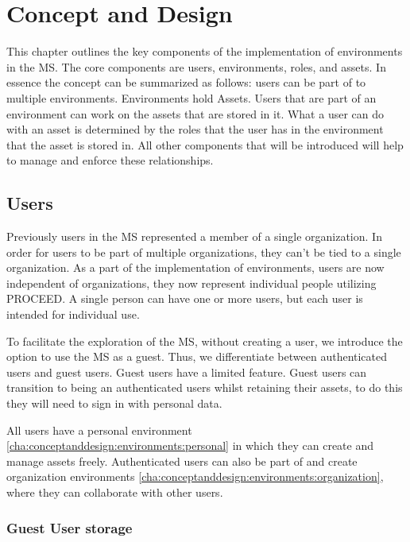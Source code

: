 \chapter{Concept and Design}
\label{cha:conceptanddesign}

This chapter outlines the key components of the implementation of environments in the MS.
The core components are users, environments, roles, and assets.
In essence the concept can be summarized as follows: users can be part of to multiple environments.
Environments hold Assets.
Users that are part of an environment can work on the assets that are stored in it.
What a user can do with an asset is determined by the roles that the user has in the
environment that the asset is stored in.
All other components that will be introduced will help to manage and enforce these relationships.

\section{Users}
\label{cha:conceptanddesign:users}

Previously users in the MS represented a member of a single organization.
In order for users to be part of multiple organizations, they can't be tied to a single
organization.
As a part of the implementation of environments, users are now independent of
organizations,
they now represent individual people utilizing PROCEED.
A single person can have one or more users, but each user is intended for individual use.

To facilitate the exploration of the MS, without creating a user, we introduce the option
to use the MS as a guest.
Thus, we differentiate between authenticated users and guest users.
Guest users have a limited feature. 
Guest users can transition to being an authenticated users whilst retaining their
assets, to do this they will need to sign in with personal data.

All users have a personal environment \ref{cha:conceptanddesign:environments:personal}
in which they can create and manage assets freely.
Authenticated users can also be part of and create organization environments
\ref{cha:conceptanddesign:environments:organization},
where they can collaborate with other users.

\subsection{Guest User storage}

